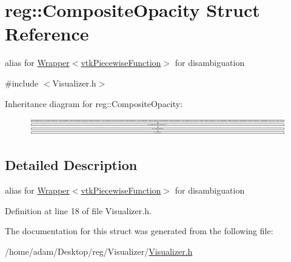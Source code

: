 \hypertarget{structreg_1_1_composite_opacity}{}\section{reg\+:\+:Composite\+Opacity Struct Reference}
\label{structreg_1_1_composite_opacity}


alias for \hyperlink{structreg_1_1_wrapper}{Wrapper$<$vtk\+Piecewise\+Function$>$} for disambiguation  




{\ttfamily \#include $<$Visualizer.\+h$>$}

Inheritance diagram for reg\+:\+:Composite\+Opacity\+:\begin{figure}[H]
\begin{center}
\leavevmode
\includegraphics[height=0.771084cm]{structreg_1_1_composite_opacity}
\end{center}
\end{figure}


\subsection{Detailed Description}
alias for \hyperlink{structreg_1_1_wrapper}{Wrapper$<$vtk\+Piecewise\+Function$>$} for disambiguation 

Definition at line 18 of file Visualizer.\+h.



The documentation for this struct was generated from the following file\+:\begin{DoxyCompactItemize}
\item 
/home/adam/\+Desktop/reg/\+Visualizer/\hyperlink{_visualizer_8h}{Visualizer.\+h}\end{DoxyCompactItemize}
